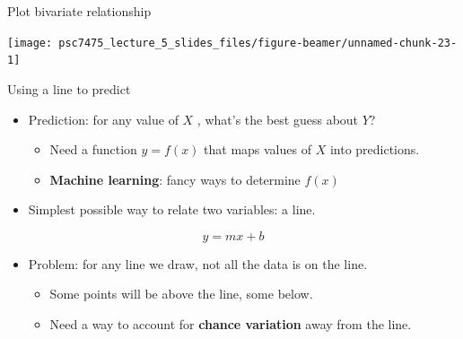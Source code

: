 \documentclass[
  ignorenonframetext,
]{beamer}
\providecommand{\tightlist}{%
  \setlength{\itemsep}{0pt}\setlength{\parskip}{0pt}}
\begin{document}
\begin{frame}{Plot bivariate relationship}
\label{plot-bivariate-relationship}
\begin{center}\texttt{[image: psc7475\_lecture\_5\_slides\_files/figure-beamer/unnamed-chunk-23-1]} \end{center}
\end{frame}

\begin{frame}{Using a line to predict}
\label{using-a-line-to-predict}
\pause

\begin{itemize}
\tightlist
\item
  Prediction: for any value of \(X\) , what's the best guess about
  \(Y\)? \pause

  \begin{itemize}
  \tightlist
  \item
    Need a function \(y = f(x)\) that maps values of \(X\) into
    predictions. \pause
  \item
    \textbf{Machine learning}: fancy ways to determine \(f(x)\) \pause
  \end{itemize}
\item
  Simplest possible way to relate two variables: a line. \pause
\end{itemize}

\[  
y = mx + b
\]

\pause

\begin{itemize}
\tightlist
\item
  Problem: for any line we draw, not all the data is on the line. \pause

  \begin{itemize}
  \tightlist
  \item
    Some points will be above the line, some below. \pause
  \item
    Need a way to account for \textbf{chance variation} away from the
    line.
  \end{itemize}
\end{itemize}
\end{frame}
\end{document}
